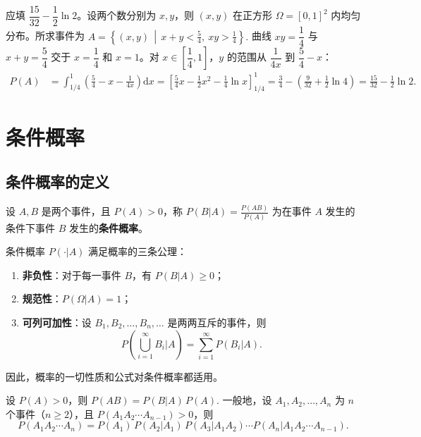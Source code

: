 \documentclass[lang=cn,11pt]{elegantbook}
\begin{document}
\begin{solution}
应填 \(\dfrac{15}{32}-\dfrac{1}{2}\ln 2\)。设两个数分别为 \(x,y\)，则 \((x,y)\) 在正方形 \(\Omega=[0,1]^2\) 内均匀分布。所求事件为
\(A = \left\{(x,y)\,\middle|\, x+y<\frac{5}{4},\ xy>\frac{1}{4}\right\}.\)
曲线 \(xy=\dfrac{1}{4}\) 与 \(x+y=\dfrac{5}{4}\) 交于 \(x=\dfrac{1}{4}\) 和 \(x=1\)。对 \(x\in\left[\dfrac{1}{4},1\right]\)，\(y\) 的范围从 \(\dfrac{1}{4x}\) 到 \(\dfrac{5}{4}-x\)：
\begin{align*}
P(A) &= \int_{1/4}^{1}\left(\frac{5}{4}-x-\frac{1}{4x}\right)\mathrm{d}x = \left[\frac{5}{4}x-\frac{1}{2}x^2-\frac{1}{4}\ln x\right]_{1/4}^{1} = \frac{3}{4}-\left(\frac{9}{32}+\frac{1}{2}\ln 4\right) = \frac{15}{32}-\frac{1}{2}\ln 2.
\end{align*}
\end{solution}

\section{条件概率}

\subsection{条件概率的定义}

\begin{definition}[条件概率] \label{def:conditional-prob}
设 \(A, B\) 是两个事件，且 \(P(A) > 0\)，称
\(
P(B|A) = \frac{P(AB)}{P(A)}
\)
为在事件 \(A\) 发生的条件下事件 \(B\) 发生的\textbf{条件概率}。
\end{definition}

\begin{property}\label{prop:conditional-prob}
条件概率 \(P(\cdot|A)\) 满足概率的三条公理：
\begin{enumerate}
    \item \textbf{非负性}：对于每一事件 \(B\)，有 \(P(B|A) \ge 0\)；
    \item \textbf{规范性}：\(P(\Omega|A) = 1\)；
    \item \textbf{可列可加性}：设 \(B_1, B_2, \dots, B_n, \dots\) 是两两互斥的事件，则
    \[
    P\!\left(\bigcup_{i=1}^{\infty} B_i \Big| A\right) = \sum_{i=1}^{\infty} P(B_i|A).
    \]
\end{enumerate}
因此，概率的一切性质和公式对条件概率都适用。
\end{property}

\begin{theorem}[乘法公式] \label{thm:multiplication}
设 \(P(A) > 0\)，则
\(
P(AB) = P(B|A)\,P(A).
\)
一般地，设 \(A_1, A_2, \dots, A_n\) 为 \(n\) 个事件（\(n \ge 2\)），且 \(P(A_1 A_2 \cdots A_{n-1}) > 0\)，则
\[
P(A_1 A_2 \cdots A_n) = P(A_1)\,P(A_2|A_1)\,P(A_3|A_1 A_2) \cdots P(A_n|A_1 A_2 \cdots A_{n-1}).
\]
\end{theorem}
\end{document}
